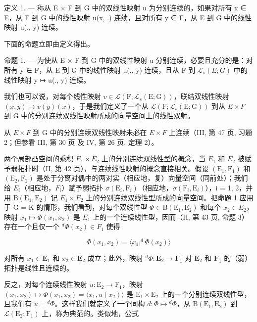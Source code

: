定义 1. --- 称从 E × F 到 G 中的双线性映射 u 为分别连续的，如果对所有 x ∈ E，从 F 到 G 中的线性映射 u(x, .) 连续，且对所有 y ∈ F，从 E 到 G 中的线性映射 u(., y) 连续。

下面的命题立即由定义得出。

命题 1. --- 为使从 E × F 到 G 中的双线性映射 u 分别连续，必要且充分的是：对所有 y ∈ F，从 E 到 G 中的线性映射 u(., y) 连续，且从 F 到 \(\mathcal{L}_s(E; G)\) 中的线性映射 y ↦ u(., y) 连续。

我们也可以说，对每个线性映射 \(v \in \mathcal{L}\left(\mathrm{F}; \mathcal{L}_{s}(\mathrm{E}; \mathrm{G})\right)\)，联结双线性映射 \((x, y) \mapsto v(y)(x)\)，于是我们定义了一个从 \(\mathcal{L}(\mathrm{F}; \mathcal{L}_{s}(\mathrm{E}; \mathrm{G}))\) 到从 \(E \times F\) 到 G 中的分别连续双线性映射所成的向量空间上的线性双射。

从 \(E \times F\) 到 G 中的分别连续双线性映射未必在 \(E \times F\) 上连续（III, 第 47 页, 习题 2；但参看 III, 第 30 页 及 IV, 第 26 页, 定理 2）。

两个局部凸空间的乘积 \(E_{1} \times E_{2}\) 上的分别连续双线性型的概念，当 \(E_{1}\) 和 \(E_{2}\) 被赋予弱拓扑时（II, 第 42 页），与连续线性映射的概念直接相关。假设 \((\mathrm{E}_{1}, \mathrm{F}_{1})\) 和 \((\mathrm{E}_{2}, \mathrm{F}_{2})\) 是处于分离对偶中的两对实（相应地，复）向量空间（同前处）；我们给 \(E_{i}\)（相应地，\(F_{i}\)）赋予弱拓扑 \(\sigma(\mathrm{E}_{i}, \mathrm{F}_{i})\)（相应地，\(\sigma(\mathrm{F}_{i}, \mathrm{E}_{i})\)），i = 1, 2，并用 \(\mathrm{B}(\mathrm{E}_{1}, \mathrm{E}_{2})\) 记 \(E_{1} \times E_{2}\) 上的分别连续双线性型所成的向量空间。把命题 1 应用于 G = K 的情形，我们看到，对每个双线性型 \(\Phi \in \mathrm{B}(\mathrm{E}_{1}, \mathrm{E}_{2})\) 和每个 \(x_{2} \in E_{2}\)，映射 \(x_{1} \mapsto \Phi(x_{1}, x_{2})\) 是 \(E_{1}\) 上的一个连续线性型，因而（II, 第 43 页, 命题 3）存在一个且仅一个 \(^{d}\Phi(x_{2}) \in F_{1}\) 使得

\[
\Phi (x _ {1}, x _ {2}) = \langle x _ {1}, ^ {d} \Phi (x _ {2}) \rangle\tag{1}
\]

对所有 \(x_1 \in \mathbf{E}_1\) 和 \(x_2 \in \mathbf{E}_2\) 成立；此外，映射 \(^d\Phi: \mathbf{E}_2 \to \mathbf{F}_1\) 对 \(\mathbf{E}_2\) 和 \(\mathbf{F}_1\) 的（弱）拓扑是线性且连续的。

反之，对每个连续线性映射 \(u: \mathrm{E}_2 \to \mathrm{F}_1\)，映射 \((x_1, x_2) \mapsto \Phi(x_1, x_2) = \langle x_1, u(x_2) \rangle\) 是 \(\mathrm{E}_1 \times \mathrm{E}_2\) 上的一个分别连续双线性型，且我们有 \(u = {}^d\Phi\)。这样我们就定义了一个同构 \(d: \Phi \mapsto {}^d\Phi\)，从 \(\mathrm{B}(\mathrm{E}_1, \mathrm{E}_2)\) 到 \(\mathcal{L}(\mathrm{E}_2; \mathrm{F}_1)\) 上，称为典范的。类似地，公式

